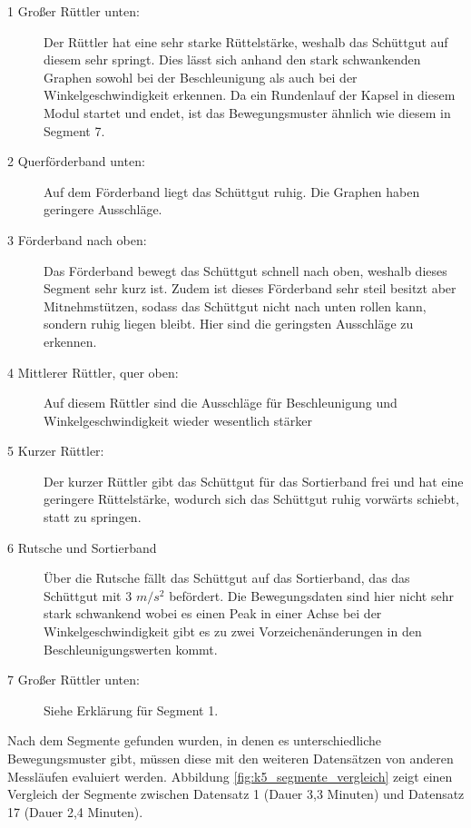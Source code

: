 \begin{description}
	\item [1 Großer Rüttler unten:] Der Rüttler hat eine sehr starke Rüttelstärke, weshalb das Schüttgut auf diesem sehr springt. Dies lässt sich anhand den stark schwankenden Graphen sowohl bei der Beschleunigung als auch bei der Winkelgeschwindigkeit erkennen. Da ein Rundenlauf der Kapsel in diesem Modul startet und endet, ist das Bewegungsmuster ähnlich wie diesem in Segment 7.
	\item [2 Querförderband unten:] Auf dem Förderband liegt das Schüttgut ruhig. Die Graphen haben geringere Ausschläge. 
	\item [3 Förderband nach oben:] Das Förderband bewegt das Schüttgut schnell nach oben, weshalb dieses Segment sehr kurz ist. Zudem ist dieses Förderband sehr steil besitzt aber Mitnehmstützen, sodass das Schüttgut nicht nach unten rollen kann, sondern ruhig liegen bleibt. Hier sind die geringsten Ausschläge zu erkennen.
	\item [4 Mittlerer Rüttler, quer oben:] Auf diesem Rüttler sind die Ausschläge für Beschleunigung und Winkelgeschwindigkeit wieder wesentlich stärker
	\item [5 Kurzer Rüttler:] Der kurzer Rüttler gibt das Schüttgut für das Sortierband frei und hat eine geringere Rüttelstärke, wodurch sich das Schüttgut ruhig vorwärts schiebt, statt zu springen.
	\item [6 Rutsche und Sortierband] Über die Rutsche fällt das Schüttgut auf das Sortierband, das das Schüttgut mit 3 $m/s^{2}$ befördert. Die Bewegungsdaten sind hier nicht sehr stark schwankend wobei es einen Peak in einer Achse bei der Winkelgeschwindigkeit gibt es zu zwei Vorzeichenänderungen in den Beschleunigungswerten kommt.   
	\item [7 Großer Rüttler unten:] Siehe Erklärung für Segment 1.	
\end{description}

Nach dem Segmente gefunden wurden, in denen es unterschiedliche Bewegungsmuster gibt, müssen diese mit den weiteren Datensätzen von anderen Messläufen evaluiert werden. Abbildung \ref{fig:k5_segmente_vergleich} zeigt einen Vergleich der Segmente zwischen Datensatz 1 (Dauer 3,3 Minuten) und Datensatz 17 (Dauer 2,4 Minuten). 

